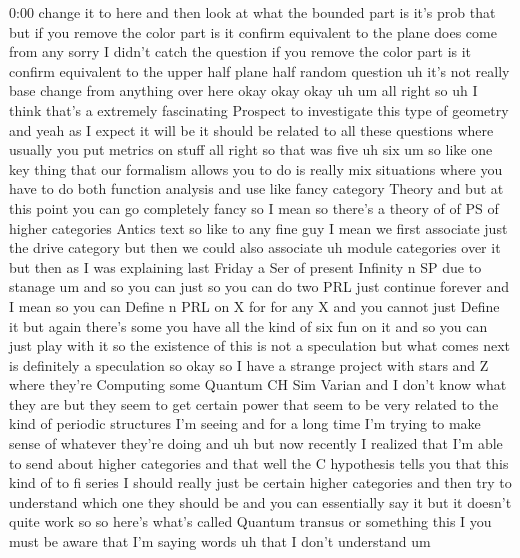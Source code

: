 \begin{unfinished}{0:00}
change  it  to  here  and  then  look  at  what
the  bounded  part  is  it's  prob
that  but  if  you  remove  the  color  part  is
it  confirm  equivalent  to  the
plane  does  come  from
any  sorry  I  didn't  catch  the  question  if
you  remove  the  color  part  is  it  confirm
equivalent  to  the  upper  half
plane  half  random  question
uh  it's  not  really  base  change  from
anything  over
here  okay  okay  okay
uh
um  all  right  so  uh  I  think  that's  a
extremely  fascinating  Prospect  to
investigate  this  type  of
geometry  and  yeah  as  I  expect  it  will  be
it  should  be  related  to  all  these
questions  where  usually  you  put  metrics
on
stuff  all  right  so  that  was  five  uh
six  um
so  like  one  key  thing  that  our  formalism
allows  you  to  do  is  really  mix
situations  where  you  have  to  do  both
function  analysis  and  use  like  fancy
category
Theory  and  but  at  this  point  you  can  go
completely  fancy  so  I  mean  so  there's  a
theory
of  of  PS  of  higher
categories
Antics
text  so  like  to  any  fine  guy  I  mean  we
first  associate  just  the  drive  category
but  then  we  could  also
associate  uh  module  categories  over  it
but  then  as  I  was  explaining  last  Friday
a  Ser  of  present  Infinity  n  SP  due  to
stanage  um  and  so  you  can  just  so  you
can  do  two
PRL  just  continue  forever  and  I  mean  so
you  can  Define  n  PRL  on  X  for  for  any
X  and  you  cannot  just  Define  it  but
again  there's  some  you  have  all  the  kind
of  six  fun  on  it  and
so  you  can  just  play  with
it  so  the  existence  of  this  is  not  a
speculation  but  what  comes  next  is
definitely  a
speculation
so  okay  so  I  have  a  strange  project  with
stars  and  Z  where  they're  Computing  some
Quantum  CH  Sim  Varian  and  I  don't  know
what  they  are  but  they  seem  to  get
certain  power  that  seem  to  be  very
related  to  the  kind  of  periodic
structures  I'm  seeing  and  for  a  long
time  I'm  trying  to  make  sense  of
whatever  they're  doing
and
uh  but  now  recently  I  realized  that  I'm
able  to  send  about  higher
categories  and  that  well  the  C
hypothesis  tells  you  that  this  kind  of
to  fi  series  I  should  really  just  be
certain  higher  categories  and  then  try
to  understand  which  one  they  should  be
and  you  can  essentially  say  it  but  it
doesn't  quite  work
so  so  here's  what's  called  Quantum
transus  or  something
this  I  you  must  be  aware  that  I'm  saying
words  uh  that  I  don't  understand
um

\end{unfinished}
